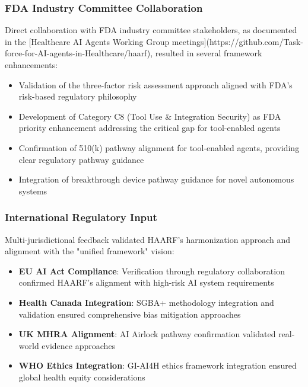 \documentclass[11pt]{article}
\begin{document}
\subsubsection{FDA Industry Committee Collaboration}

Direct collaboration with FDA industry committee stakeholders, as documented in the [Healthcare AI Agents Working Group meetings](https://github.com/Task-force-for-AI-agents-in-Healthcare/haarf), resulted in several framework enhancements:

\begin{itemize}
    \item Validation of the three-factor risk assessment approach aligned with FDA's risk-based regulatory philosophy
    \item Development of Category C8 (Tool Use \& Integration Security) as FDA priority enhancement addressing the critical gap for tool-enabled agents
    \item Confirmation of 510(k) pathway alignment for tool-enabled agents, providing clear regulatory pathway guidance
    \item Integration of breakthrough device pathway guidance for novel autonomous systems
\end{itemize}

\subsubsection{International Regulatory Input}

Multi-jurisdictional feedback validated HAARF's harmonization approach and alignment with the "unified framework" vision:

\begin{itemize}
    \item \textbf{EU AI Act Compliance}: Verification through regulatory collaboration confirmed HAARF's alignment with high-risk AI system requirements \cite{eu2024aiact}
    \item \textbf{Health Canada Integration}: SGBA+ methodology integration and validation ensured comprehensive bias mitigation approaches \cite{healthcanada2021sgba}
    \item \textbf{UK MHRA Alignment}: AI Airlock pathway confirmation validated real-world evidence approaches \cite{mhra2023aiairlock}
    \item \textbf{WHO Ethics Integration}: GI-AI4H ethics framework integration ensured global health equity considerations \cite{who2021ethics}
\end{itemize}
\end{document}
